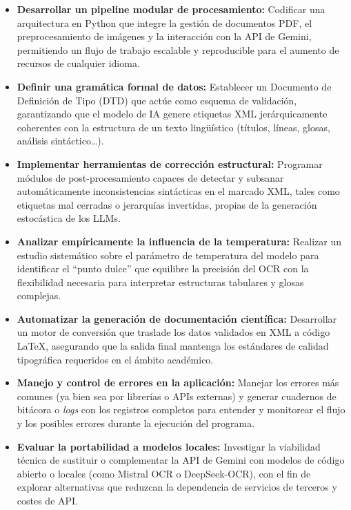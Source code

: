 \begin{itemize}
    \item \textbf{Desarrollar un pipeline modular de procesamiento:} Codificar una arquitectura en Python que integre la gestión de documentos PDF, el preprocesamiento de imágenes y la interacción con la API de Gemini, permitiendo un flujo de trabajo escalable y reproducible para el aumento de recursos de cualquier idioma.
    
    \item \textbf{Definir una gramática formal de datos:} Establecer un Documento de Definición de Tipo (DTD) que actúe como esquema de validación, garantizando que el modelo de IA genere etiquetas XML jerárquicamente coherentes con la estructura de un texto lingüístico (títulos, líneas, glosas, análisis sintáctico\ldots).
    
    \item \textbf{Implementar herramientas de corrección estructural:} Programar módulos de post-procesamiento capaces de detectar y subsanar automáticamente inconsistencias sintácticas en el marcado XML, tales como etiquetas mal cerradas o jerarquías invertidas, propias de la generación estocástica de los LLMs.
    
    \item \textbf{Analizar empíricamente la influencia de la temperatura:} Realizar un estudio sistemático sobre el parámetro de temperatura del modelo para identificar el ``punto dulce'' que equilibre la precisión del OCR con la flexibilidad necesaria para interpretar estructuras tabulares y glosas complejas.
    
    \item \textbf{Automatizar la generación de documentación científica:} Desarrollar un motor de conversión que traslade los datos validados en XML a código \LaTeX{}, asegurando que la salida final mantenga los estándares de calidad tipográfica requeridos en el ámbito académico.
    
    \item \textbf{Manejo y control de errores en la aplicación:} Manejar los errores más comunes (ya bien sea por librerías o APIs externas) y generar cuadernos de bitácora o \textit{logs} con los registros completos para entender y monitorear el flujo y los posibles errores durante la ejecución del programa.
    
    \item \textbf{Evaluar la portabilidad a modelos locales:} Investigar la viabilidad técnica de sustituir o complementar la API de Gemini con modelos de código abierto o locales (como Mistral OCR o DeepSeek-OCR), con el fin de explorar alternativas que reduzcan la dependencia de servicios de terceros y costes de API.
\end{itemize}